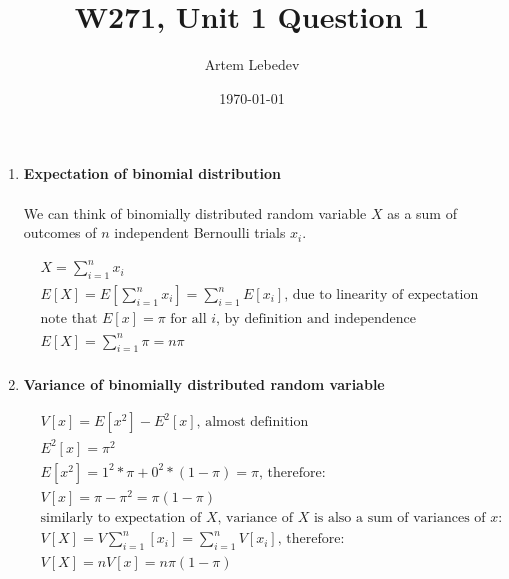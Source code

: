 \documentclass{article}
\author{Artem Lebedev}
\title{W271, Unit 1 Question 1}
\date{\today}
\begin{document}
	
	\maketitle

	\begin{enumerate}
		
	\item {\large \textbf{Expectation of binomial distribution}}\\\\
	We can think of binomially distributed random variable $X$ as a sum of outcomes of $n$ independent Bernoulli trials $x_{i}$.
	
	$\begin{aligned}
		&X = \sum_{i = 1}^{n}x_{i}\\
		&E[X] = E[\sum_{i = 1}^{n}x_{i}] = \sum_{i = 1}^{n}E[x_{i}]\text{, due to linearity of expectation}\\
		&\text {note that $E[x] = \pi$ for all $i$, by definition and independence }\\
		& E[X] = \sum_{i = 1}^{n}\pi = n\pi\\
	\end{aligned}$
	
	\item {\large \textbf{Variance of binomially distributed random variable}}
	
	$\begin{aligned}
		&V[x]=E[x^2]-E^2[x]\text{, almost definition}\\
		&E^2[x] = \pi^2\\
		&E[x^2] = 1^2*\pi + 0^2 *(1-\pi) = \pi \text{, therefore:}\\
		&V[x]=\pi-\pi^2=\pi(1-\pi)\\
		&\text {similarly to expectation of $X$, variance of $X$ is also a sum of variances of $x$}:\\
		&V[X] = V\sum_{i = 1}^{n}[x_{i}] = \sum_{i = 1}^{n}V[x_{i}]\text{, therefore:}\\
		&V[X] = nV[x] = n\pi(1-\pi)\\
	\end{aligned}$
		
	\end{enumerate}
	
\end{document}
